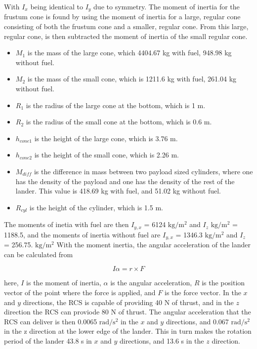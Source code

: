 With $I_x$ being identical to $I_y$ due to symmetry. The moment of inertia for the frustum cone is found by using the moment of inertia for a large, regular cone consisting of both the frustum cone and a smaller, regular cone. From this large, regular cone, is then subtracted the moment of inertia of the small regular cone. 

\begin{itemize}
\item $M_1$ is the mass of the large cone, which 4404.67 kg with fuel, 948.98 kg without fuel.
\item $M_2$ is the mass of the small cone, which is 1211.6 kg with fuel, 261.04 kg without fuel.
\item $R_1$ is the radius of the large cone at the bottom, which is 1 m.
\item $R_2$ is the radius of the small cone at the bottom, which is 0.6 m.
\item $h_{cone1}$ is the height of the large cone, which is 3.76 m.
\item $h_{cone2}$ is the height of the small cone, which is 2.26 m.
\item $M_{diff}$ is the difference in mass between two payload sized cylinders, where one has the density of the payload and one has the density of the rest of the lander. This value is 418.69 kg with fuel, and 51.02 kg without fuel.
\item $R_{cyl}$ is the height of the cylinder, which is 1.5 m.
\end{itemize}

The moments of inetia with fuel are then $I_{y,x}$ = 6124 $\mathrm{kg/m^2}$ and $I_{z}$ $\mathrm{kg/m^2}$ = 1188.5, and the moments of inertia without fuel are $I_{y,x}$ = 1346.3 $\mathrm{kg/m^2}$ and $I_{z}$ = 256.75. $\mathrm{kg/m^2}$ With the moment inertia, the angular acceleration of the lander can be calculated from

\begin{equation}
    I \alpha = r \times F
\end{equation}
    
here, $I$ is the moment of inertia, $\alpha$ is the angular acceleration, $R$ is the position vector of the point where the force is applied, and $F$ is the force vector. In the $x$ and $y$ directions, the RCS is capable of providing 40 N of thrust, and in the $z$ direction the RCS can proviode 80 N of thrust. The angular acceleration that the RCS can deliver is then 0.0065 $\mathrm{rad/s^2}$ in the $x$ and $y$ directions, and 0.067 $\mathrm{rad/s^2}$ in the z direction at the lower edge of the lander. This in turn makes the rotation period of the lander 43.8 s in $x$ and $y$ directions, and 13.6 s in the $z$ direction.\\

